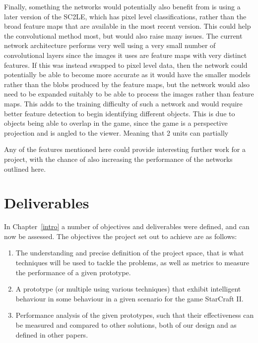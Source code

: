 Finally, something the networks would potentially also benefit from is using a
later version of the SC2LE, which has pixel level classifications, rather than
the broad feature maps that are available in the most recent version. This could
help the convolutional method most, but would also raise many issues. The
current network architecture performs very well using a very small number of
convolutional layers since the images it uses are feature maps with very
distinct features. If this was instead swapped to pixel level data, then the
network could potentially be able to become more accurate as it would have the
smaller models rather than the blobs produced by the feature maps, but the
network would also need to be expanded suitably to be able to process the images
rather than feature maps. This adds to the training difficulty of such a network
and would require better feature detection to begin identifying different
objects. This is due to objects being able to overlap in the game, since the
game is a perspective
projection and is angled to the viewer. Meaning that 2 units can partially

Any of the features mentioned here could provide interesting further work for
a project, with the chance of also increasing the performance of the networks
outlined here.

\section{Deliverables}

In Chapter~\ref{intro} a number of objectives and deliverables were defined, and
can now be assessed. The objectives the project set out to achieve are as
follows:

\begin{enumerate}
    \item The understanding and precise definition of the project space, that is
        what techniques will be used to tackle the problems, as well as metrics
        to measure the performance of a given prototype.
    \item A prototype (or multiple using various techniques) that exhibit
        intelligent behaviour in some behaviour in a given scenario for
        the game StarCraft II\@.
    \item Performance analysis of the given prototypes, such that their
        effectiveness can be measured and compared to other solutions, both of
        our design and as defined in other papers.
\end{enumerate}


